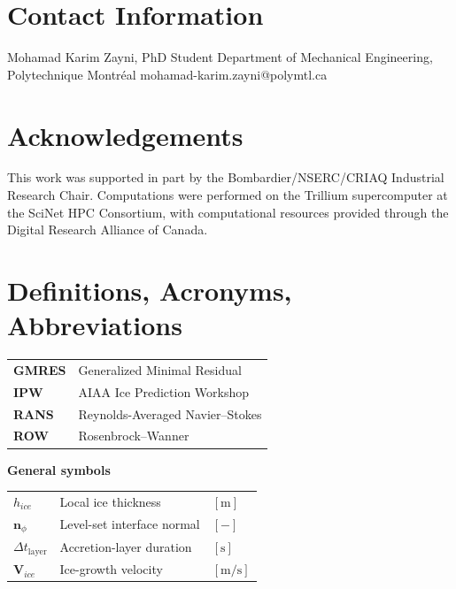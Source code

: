 \documentclass[letterpaper,times]{sae}
\begin{document}
\section{Contact Information}
Mohamad Karim Zayni, PhD Student\newline
Department of Mechanical Engineering, Polytechnique Montr\'{e}al\newline
mohamad-karim.zayni@polymtl.ca


\section{Acknowledgements}

This work was supported in part by the Bombardier/NSERC/CRIAQ Industrial Research Chair. Computations were performed on the Trillium supercomputer at the SciNet HPC Consortium, with computational resources provided through the Digital Research Alliance of Canada.



\section{Definitions, Acronyms, Abbreviations}

\begin{table}[h]
\centering
\begin{tabular}{L{0.12\textwidth} L{0.35\textwidth}}
\textbf{GMRES}  & Generalized Minimal Residual \\
\textbf{IPW}    & AIAA Ice Prediction Workshop \\
\textbf{RANS}   & Reynolds-Averaged Navier--Stokes \\
\textbf{ROW}    & Rosenbrock--Wanner \\
\end{tabular}
\end{table}



\textbf{General symbols}

\begin{table}[h]
\centering
\begin{tabular}{L{0.10\textwidth} L{0.27\textwidth} L{0.08\textwidth}}
$h_{ice}$                   & Local ice thickness         & $[\mathrm{m}]$ \\
$\boldsymbol{n}_{\phi}$     & Level-set interface normal  & $[-]$ \\
$\Delta t_{\mathrm{layer}}$ & Accretion-layer duration    & $[\mathrm{s}]$ \\
$\boldsymbol{V}_{ice}$      & Ice-growth velocity         & $[\mathrm{m/s}]$ \\
\end{tabular}
\end{table}
\end{document}
